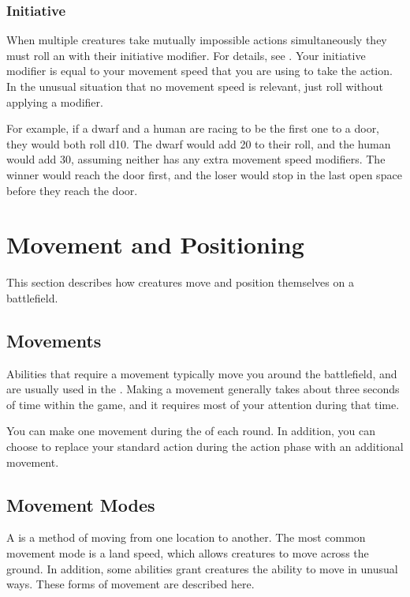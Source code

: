         \subsubsection{Initiative}\label{Initiative}
            When multiple creatures take mutually impossible actions simultaneously they must roll an  with their initiative modifier.
            For details, see .
            Your initiative modifier is equal to your movement speed that you are using to take the action.
            In the unusual situation that no movement speed is relevant, just roll without applying a modifier.

            For example, if a dwarf and a human are racing to be the first one to a door, they would both roll d10.
            The dwarf would add 20 to their roll, and the human would add 30, assuming neither has any extra movement speed modifiers.
            The winner would reach the door first, and the loser would stop in the last open space before they reach the door.

\section{Movement and Positioning}\label{Movement and Positioning}
    This section describes how creatures move and position themselves on a battlefield.

    \subsection{Movements}\label{Movements}
        Abilities that require a movement typically move you around the battlefield, and are usually used in the .
        Making a movement generally takes about three seconds of time within the game, and it requires most of your attention during that time.

        You can make one movement during the  of each round.
        In addition, you can choose to replace your standard action during the action phase with an additional movement.

    \subsection{Movement Modes}\label{Movement Modes}
        A  is a method of moving from one location to another.
        The most common movement mode is a land speed, which allows creatures to move across the ground.
        In addition, some abilities grant creatures the ability to move in unusual ways.
        These forms of movement are described here.

